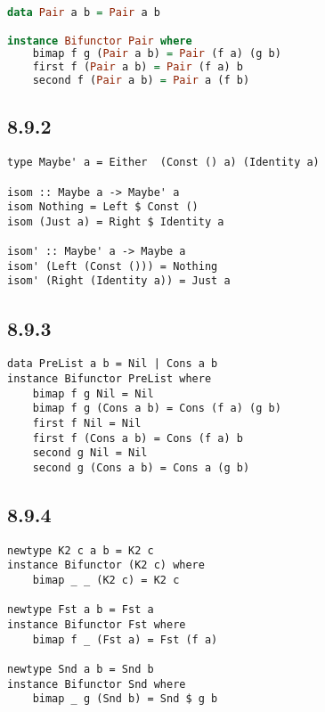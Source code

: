 \documentclass[11pt]{article}
\begin{document}
        \begin{lstlisting}[language=Haskell]
data Pair a b = Pair a b

instance Bifunctor Pair where
    bimap f g (Pair a b) = Pair (f a) (g b)
    first f (Pair a b) = Pair (f a) b
    second f (Pair a b) = Pair a (f b)
        \end{lstlisting}

    \subsection*{8.9.2}

        \begin{lstlisting}
type Maybe' a = Either  (Const () a) (Identity a)

isom :: Maybe a -> Maybe' a
isom Nothing = Left $ Const ()
isom (Just a) = Right $ Identity a

isom' :: Maybe' a -> Maybe a
isom' (Left (Const ())) = Nothing
isom' (Right (Identity a)) = Just a
        \end{lstlisting}

    \subsection*{8.9.3}

        \begin{lstlisting}
data PreList a b = Nil | Cons a b
instance Bifunctor PreList where
    bimap f g Nil = Nil
    bimap f g (Cons a b) = Cons (f a) (g b)
    first f Nil = Nil
    first f (Cons a b) = Cons (f a) b
    second g Nil = Nil
    second g (Cons a b) = Cons a (g b)
        \end{lstlisting}

    \subsection*{8.9.4}

        \begin{lstlisting}
newtype K2 c a b = K2 c
instance Bifunctor (K2 c) where 
    bimap _ _ (K2 c) = K2 c

newtype Fst a b = Fst a
instance Bifunctor Fst where
    bimap f _ (Fst a) = Fst (f a)

newtype Snd a b = Snd b
instance Bifunctor Snd where
    bimap _ g (Snd b) = Snd $ g b
        \end{lstlisting}
\end{document}
